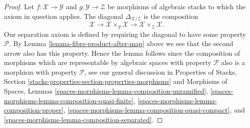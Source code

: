 \documentclass[10pt,a4paper]{amsart}
\theoremstyle{plain}
\theoremstyle{definition}
\theoremstyle{remark}
\numberwithin{equation}{subsection}
\begin{document}
\begin{proof}
Let $f : \mathcal{X} \to \mathcal{Y}$ and
$g : \mathcal{Y} \to \mathcal{Z}$ be morphisms of algebraic stacks
to which the axiom in question applies.
The diagonal $\Delta_{\mathcal{X}/\mathcal{Z}}$ is the composition
$$
\mathcal{X} \longrightarrow
\mathcal{X} \times_\mathcal{Y} \mathcal{X} \longrightarrow
\mathcal{X} \times_\mathcal{Z} \mathcal{X}.
$$
Our separation axiom is defined by requiring the diagonal
to have some property $\mathcal{P}$. By
Lemma \ref{lemma-fibre-product-after-map}
above we see that the second arrow also has this property.
Hence the lemma follows since the composition of
morphisms which are representable by algebraic spaces with property
$\mathcal{P}$ also is a morphism with property $\mathcal{P}$, see
our general discussion in
Properties of Stacks,
Section \ref{stacks-properties-section-properties-morphisms}
and
Morphisms of Spaces, Lemmas
\ref{spaces-morphisms-lemma-composition-unramified},
\ref{spaces-morphisms-lemma-composition-quasi-finite},
\ref{spaces-morphisms-lemma-composition-proper},
\ref{spaces-morphisms-lemma-composition-quasi-compact}, and
\ref{spaces-morphisms-lemma-composition-separated}.
\end{proof}
\end{document}
